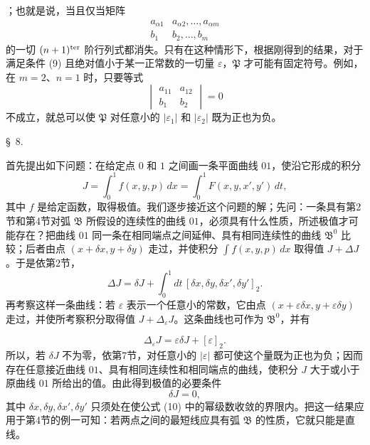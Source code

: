 \documentclass[11pt,a4paper,leqno]{article}
\begin{document}
；也就是说，当且仅当矩阵
\[
\begin{matrix}
a_{\alpha1} & a_{\alpha2},\ldots, a_{\alpha m}\\
b_1 & b_2,\ldots, b_m
\end{matrix}
\]
的一切 $(n+1)^{\rm ter}$ 阶行列式都消失。只有在这种情形下，根据刚得到的结果，对于满足条件 (9) 且绝对值小于某一正常数的一切量 $\varepsilon$，$\mathfrak{P}$ 才可能有固定符号。例如，在 $m=2$、$n=1$ 时，只要等式
\[
\begin{vmatrix}
a_{11} & a_{12}\\
b_1 & b_2
\end{vmatrix}=0
\]
不成立，就总可以使 $\mathfrak{P}$ 对任意小的 $|\varepsilon_1|$ 和 $|\varepsilon_2|$ 既为正也为负。

\begin{center}{\large \S~8.}\end{center}

首先提出如下问题：在给定点 $0$ 和 $1$ 之间画一条平面曲线 $01$，使沿它形成的积分
\[
J=\int_0^1 f(x,y,p)\,dx=\int_0^1 F(x,y,x',y')\,dt,
\]
其中 $f$ 是给定函数，取得极值。我们逐步接近这个问题的解；先问：一条具有第2节和第4节对弧 $\mathfrak{B}$ 所假设的连续性的曲线 $01$，必须具有什么性质，所述极值才可能存在？把曲线 $01$ 同一条在相同端点之间延伸、具有相同连续性的曲线 $\mathfrak{B}^0$ 比较；后者由点 $(x+\delta x,y+\delta y)$ 走过，并使积分 $\int f(x,y,p)\,dx$ 取得值 $J+\Delta J$。于是依第2节，
\begin{equation}\tag{10}
\Delta J=\delta J+\int_0^1 dt\,[\delta x,\delta y,\delta x',\delta y']_2.
\end{equation}
再考察这样一条曲线：若 $\varepsilon$ 表示一个任意小的常数，它由点 $(x+\varepsilon\delta x,y+\varepsilon\delta y)$ 走过，并使所考察积分取得值 $J+\Delta_\varepsilon J$。这条曲线也可作为 $\mathfrak{B}^0$，并有

\[
\Delta_\varepsilon J=\varepsilon\delta J+[\varepsilon]_2.
\]
所以，若 $\delta J$ 不为零，依第7节，对任意小的 $|\varepsilon|$ 都可使这个量既为正也为负；因而存在任意接近曲线 $01$、具有相同连续性和相同端点的曲线，使积分 $J$ 大于或小于原曲线 $01$ 所给出的值。由此得到极值的必要条件
\begin{equation}\tag{11}
\delta J=0,
\end{equation}
其中 $\delta x,\delta y,\delta x',\delta y'$ 只须处在使公式 (10) 中的幂级数收敛的界限内。把这一结果应用于第4节的例一可知：若两点之间的最短线应具有弧 $\mathfrak{B}$ 的性质，它就只能是直线。
\end{document}
